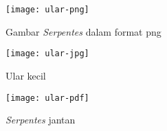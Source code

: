\begin{figure} 
	\centering  
	\texttt{[image: ular-png]}  
	\caption[Gambar {\it Serpentes} dalam format png]{Gambar {\it Serpentes} dalam format png} 
	\label{fig:ularpng} 
\end{figure} 

\begin{figure}[H]
	\centering  
	\texttt{[image: ular-jpg]}  
	\caption[Ular kecil]{Ular kecil} 
	\label{fig:ularjpg} 
\end{figure} 

\begin{figure}[ht] 
	\centering  
	\texttt{[image: ular-pdf]}  
	\caption[ {\it Serpentes} betina]{ {\it Serpentes} jantan} 
	\label{fig:ularpdf} 
\end{figure} 
 
